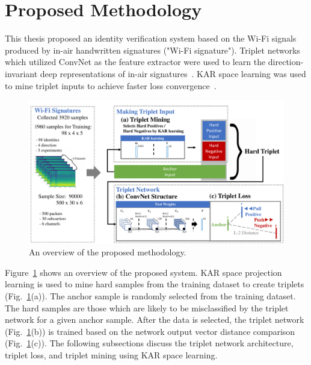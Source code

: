 \section{Proposed Methodology}
\label{sec:methodology}
This thesis proposed an identity verification system based on the Wi-Fi signals produced by in-air handwritten signatures ("Wi-Fi signature"). 
Triplet networks which utilized ConvNet as the feature extractor were used to learn the direction-invariant deep representations of in-air signatures~\cite{hoffer2015deep}. KAR space learning was used to mine triplet inputs to achieve faster loss convergence~\cite{toh2018learning,toh2018gradient}. 
\begin{figure}[!ht]
    \includegraphics[width=\textwidth]
        {fig_system_overview_v1.pdf}
    \caption{An overview of the proposed methodology.} \label{fig1}
\end{figure}
Figure~\ref{fig1} shows an overview of the proposed system. 
KAR space projection learning is used to mine hard samples from the training dataset to create triplets (Fig.~\ref{fig1}(a)). The anchor sample is randomly selected from the training dataset. The hard samples are those which are likely to be misclassified by the triplet network for a given anchor sample.
After the data is selected, the triplet network (Fig.~\ref{fig1}(b)) is trained based on the network output vector distance comparison (Fig.~\ref{fig1}(c)).
The following subsections discuss the triplet network architecture, triplet loss, and triplet mining using KAR space learning.

